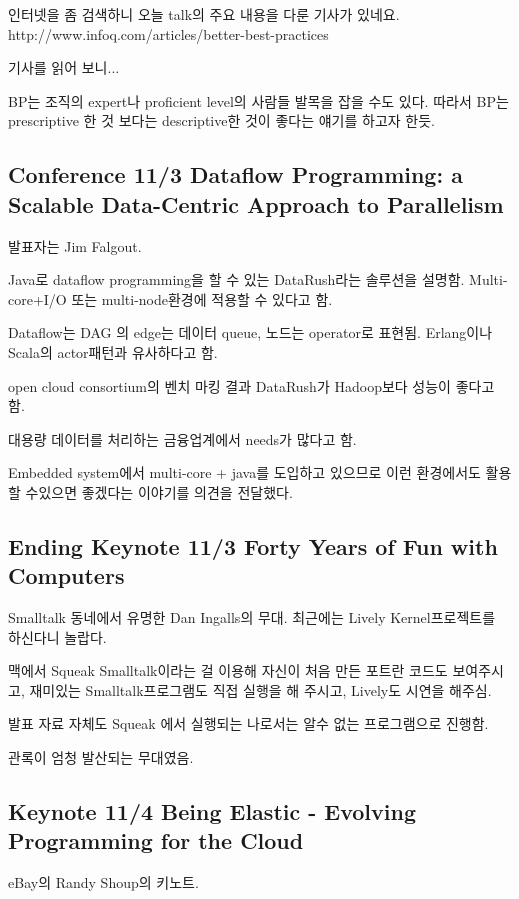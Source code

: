 \documentclass[a4paper]{article}
\begin{document}
인터넷을 좀 검색하니 오늘 talk의 주요 내용을 다룬 기사가 있네요.
http://www.infoq.com/articles/better-best-practices
 
기사를 읽어 보니...

BP는 조직의 expert나 proficient level의 사람들 발목을 잡을 수도 있다.
따라서 BP는 prescriptive 한 것 보다는 descriptive한 것이 좋다는 얘기를
하고자 한듯.
 
\subsection{Conference 11/3 Dataflow Programming: a Scalable
  Data-Centric Approach to Parallelism}
 
발표자는 Jim Falgout.
 
Java로 dataflow programming을 할 수 있는 DataRush라는 솔루션을 설명함.
Multi-core+I/O 또는 multi-node환경에 적용할 수 있다고 함.
 
Dataflow는 DAG 의 edge는 데이터 queue, 노드는 operator로 표현됨.
Erlang이나 Scala의 actor패턴과 유사하다고 함.
 
open cloud consortium의 벤치 마킹 결과 DataRush가 Hadoop보다 성능이 좋다고 함.
 
대용량 데이터를 처리하는 금융업계에서 needs가 많다고 함. 
 
Embedded system에서 multi-core + java를 도입하고 있으므로 이런
환경에서도 활용할 수있으면 좋겠다는 이야기를 의견을 전달했다.
 
\subsection{Ending Keynote 11/3 Forty Years of Fun with Computers}
 
Smalltalk 동네에서 유명한 Dan Ingalls의 무대.
최근에는  Lively Kernel프로젝트를 하신다니 놀랍다.
 
맥에서 Squeak Smalltalk이라는 걸 이용해 자신이 처음 만든 포트란 코드도
보여주시고, 재미있는 Smalltalk프로그램도 직접 실행을 해 주시고,
Lively도 시연을 해주심.
 
발표 자료 자체도 Squeak 에서 실행되는 나로서는 알수 없는 프로그램으로
진행함.
 
관록이 엄청 발산되는 무대였음. 
 
\subsection{Keynote 11/4 Being Elastic - Evolving Programming for the Cloud}
 
eBay의 Randy Shoup의 키노트.
 
\end{document}
